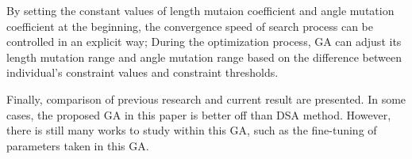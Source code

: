 By setting the constant values of length mutaion coefficient and angle mutation
coefficient at the beginning, the convergence speed of search process can be
controlled in an explicit way; During the optimization process, GA can adjust
its length mutation range and angle mutation range based on the difference
between individual's constraint values and constraint thresholds.  

Finally, comparison of previous research and current result are presented. In
some cases, the proposed GA in this paper is better off than DSA method.
However, there is still many works to study within this GA, such as the
fine-tuning of parameters taken in this GA.



